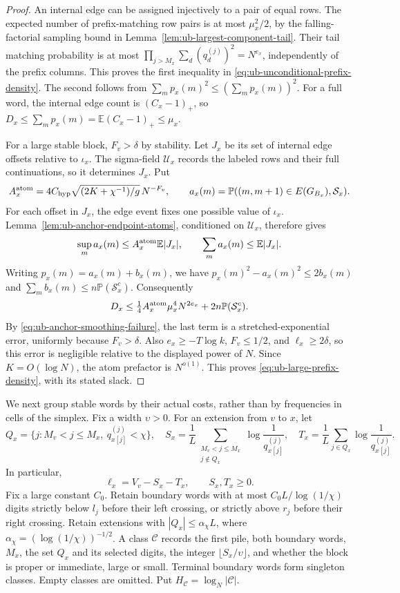 \documentclass[11pt]{article}
\numberwithin{equation}{section}
\newcommand{\E}{\mathbb E}
\newcommand{\Pp}{\mathbb P}
\newcommand{\1}{\mathbf 1}
\begin{document}
\begin{proof}
An internal edge can be assigned injectively to a pair of equal rows.
The expected number of prefix-matching row pairs is at most
$\mu_x^2/2$, by the falling-factorial sampling bound in
Lemma~\ref{lem:ub-largest-component-tail}. Their tail matching
probability is at most
$\prod_{j>M_x}\sum_d(q^{(j)}_d)^2=N^{e_x}$, independently of the
prefix columns. This proves the first inequality in
\eqref{eq:ub-unconditional-prefix-density}. The second follows from
$\sum_m p_x(m)^2\le(\sum_m p_x(m))^2$.
For a full word, the internal edge count is $(C_x-1)_+$, so
$D_x\le\sum_m p_x(m)=\E(C_x-1)_+\le\mu_x$.

For a large stable block, $F_v>\delta$ by stability. Let $J_x$
be its set of internal edge offsets relative to $\iota_x$. The
sigma-field $\mathcal U_x$ records the labeled rows and their full
continuations, so it determines $J_x$. Put
\[
 A_x^{\rm atom}=4C_{\rm hyp}
       \sqrt{(2K+\chi^{-1})/g}\,N^{-F_v},\qquad
 a_x(m)=\Pp((m,m+1)\in E(G_{B_x}),\mathcal S_x).
\]
For each offset in $J_x$, the edge event fixes one possible value of
$\iota_x$. Lemma~\ref{lem:ub-anchor-endpoint-atoms}, conditioned on
$\mathcal U_x$, therefore gives
\[
 \sup_m a_x(m)\le A_x^{\rm atom}\E|J_x|,
 \qquad \sum_m a_x(m)\le\E|J_x|.
\]
Writing $p_x(m)=a_x(m)+b_x(m)$, we have
$p_x(m)^2-a_x(m)^2\le2b_x(m)$ and
$\sum_m b_x(m)\le n\Pp(\mathcal S_x^c)$. Consequently
\[
 D_x\le\tfrac14 A_x^{\rm atom}\mu_x^4N^{2e_x}
                       +2n\Pp(\mathcal S_x^c).
\]
By \eqref{eq:ub-anchor-smoothing-failure}, the last term is a
stretched-exponential error, uniformly because $F_v>\delta$.
Also $e_x\ge-T\log k$, $F_v\le1/2$, and $\ell_x\ge2\delta$,
so this error is negligible relative to the displayed power of $N$.
Since $K=O(\log N)$, the atom prefactor is $N^{o(1)}$.
This proves \eqref{eq:ub-large-prefix-density}, with its stated slack.
\end{proof}

We next group stable words by their actual costs, rather than by
frequencies in cells of the simplex. Fix a width $\upsilon>0$.
For an extension from $v$ to $x$, let
\[
 Q_x=\{j:M_v<j\le M_x,\ q^{(j)}_{x[j]}<\chi\},\quad
 S_x=\frac1L\sum_{\substack{M_v<j\le M_x\\j\notin Q_x}}
               \log\frac1{q^{(j)}_{x[j]}},\quad
 T_x=\frac1L\sum_{j\in Q_x}\log\frac1{q^{(j)}_{x[j]}}.
\]
In particular,
\begin{equation}
\label{eq:ub-exact-word-cost-split}
 \ell_x=V_v-S_x-T_x,\qquad S_x,T_x\ge0.
\end{equation}
Fix a large constant $C_0$. Retain boundary words with at most
$C_0L/\log(1/\chi)$ digits strictly below $l_j$ before their left
crossing, or strictly above $r_j$ before their right crossing.
Retain extensions with $|Q_x|\le\alpha_\chi L$, where
$\alpha_\chi=(\log(1/\chi))^{-1/2}$.
A class $\mathcal C$ records the first pile, both boundary words, $M_x$,
the set $Q_x$ and its selected digits, the integer
$\lfloor S_x/\upsilon\rfloor$, and whether the block is proper or
immediate, large or small. Terminal boundary words form singleton
classes. Empty classes are omitted. Put $H_{\mathcal C}=\log_N|\mathcal C|$.
\end{document}
